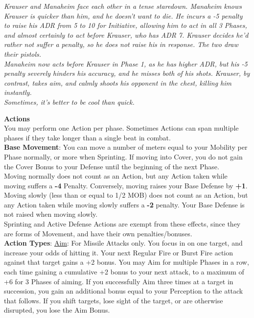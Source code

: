 \documentclass[a4paper, twocolumn, openany]{book}
\begin{document}
{{\itshape
Krauser and Manaheim face each other in a tense staredown. Manaheim knows Krauser is
quicker than him, and he doesn’t want to die. He incurs a -5 penalty to raise his ADR from 5 to
10 for Initiative, allowing him to act in all 3 Phases, and almost certainly to act before Krauser,
who has ADR 7. Krauser decides he’d rather not suffer a penalty, so he does not raise his in
response. The two draw their pistols.\\
Manaheim now acts before Krauser in Phase 1, as he has higher ADR, but his -5 penalty
severely hinders his accuracy, and he misses both of his shots. Krauser, by contrast, takes aim,
and calmly shoots his opponent in the chest, killing him instantly.\\
Sometimes, it’s better to be cool than quick.\\
}

{\bfseries Actions}\\
You may perform one Action per phase. Sometimes Actions can span multiple phases if they
take longer than a single beat in combat.\\

{\bfseries Base Movement}: You can move a number of meters equal to your Mobility per Phase normally,
or more when Sprinting. If moving into Cover, you do not gain the Cover Bonus to your Defense
until the beginning of the next Phase.\\
Moving normally does not count as an Action, but any Action taken while moving suffers a
{\bfseries -4} Penalty. Conversely, moving raises your Base Defense by {\bfseries +1}.\\
Moving slowly (less than or equal to 1/2 MOB) does not count as an Action, but any Action
taken while moving slowly suffers a {\bfseries -2} penalty. Your Base Defense is not raised when moving
slowly.\\
Sprinting and Active Defense Actions are exempt from these effects, since they are forms of
Movement, and have their own penalties/bonuses.\\

{\bfseries Action Types}:
\underline{Aim}: For Missile Attacks only. You focus in on one target, and increase your odds of hitting it.
Your next Regular Fire or Burst Fire action against that target gains a +2 bonus. You may Aim
for multiple Phases in a row, each time gaining a cumulative +2 bonus to your next attack, to a
maximum of +6 for 3 Phases of aiming. If you successfully Aim three times at a target in
succession, you gain an additional bonus equal to your Perception to the attack that follows. If
you shift targets, lose sight of the target, or are otherwise disrupted, you lose the Aim Bonus.\\

}
\end{document}
